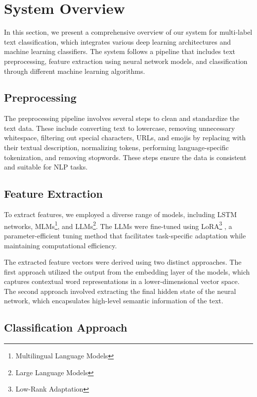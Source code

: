 \section{System Overview}

In this section, we present a comprehensive overview of our system for multi-label text classification, which integrates various deep learning architectures and machine learning classifiers. The system follows a pipeline that includes text preprocessing, feature extraction using neural network models, and classification through different machine learning algorithms.

\subsection{Preprocessing}

The preprocessing pipeline involves several steps to clean and standardize the text data. These include converting text to lowercase, removing unnecessary whitespace, filtering out special characters, URLs, and emojis by replacing with their textual description, normalizing tokens, performing language-specific tokenization, and removing stopwords. These steps ensure the data is consistent and suitable for NLP tasks.

\subsection{Feature Extraction}

To extract features, we employed a diverse range of models, including LSTM networks, MLMs\footnote{Multilingual Language Models}, and LLMs\footnote{Large Language Models}. The LLMs were fine-tuned using LoRA\footnote{Low-Rank Adaptation} \citep{hu2021lora}, a parameter-efficient tuning method that facilitates task-specific adaptation while maintaining computational efficiency.

The extracted feature vectors were derived using two distinct approaches. The first approach utilized the output from the embedding layer of the models, which captures contextual word representations in a lower-dimensional vector space. The second approach involved extracting the final hidden state of the neural network, which encapsulates high-level semantic information of the text.

\subsection{Classification Approach}

